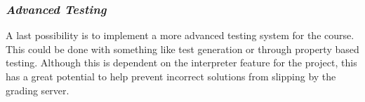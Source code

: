 \documentclass{article}
\begin{document}
\subsubsection*{\textit{Advanced Testing}}
A last possibility is to implement a more advanced testing system for the
course. This could be done with something like test generation or through
property based testing. Although this is dependent on the interpreter feature
for the project, this has a great potential to help prevent incorrect solutions
from slipping by the grading server.
\end{document}

